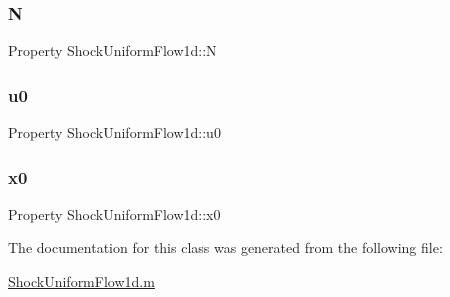 \subsubsection{\texorpdfstring{N}{N}}
{\footnotesize\ttfamily Property Shock\+Uniform\+Flow1d\+::N}

\mbox{\label{class_shock_uniform_flow1d_afb08b622dcfaf26289ce0b5d060d6705}} 
\subsubsection{\texorpdfstring{u0}{u0}}
{\footnotesize\ttfamily Property Shock\+Uniform\+Flow1d\+::u0}

\mbox{\label{class_shock_uniform_flow1d_a1b292124796a4446d48a08f2562cf657}} 
\subsubsection{\texorpdfstring{x0}{x0}}
{\footnotesize\ttfamily Property Shock\+Uniform\+Flow1d\+::x0}



The documentation for this class was generated from the following file\+:\begin{DoxyCompactItemize}
\item 
\hyperlink{_shock_uniform_flow1d_8m}{Shock\+Uniform\+Flow1d.\+m}\end{DoxyCompactItemize}

